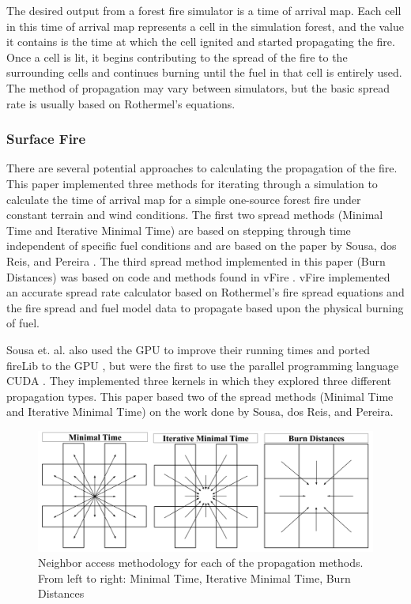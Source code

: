 The desired output from a forest fire simulator is a time of arrival map. Each cell in this time of arrival map represents a cell in the simulation forest, and the value it contains is the time at which the cell ignited and started propagating the fire. Once a cell is lit, it begins contributing to the spread of the fire to the surrounding cells and continues burning until the fuel in that cell is entirely used. The method of propagation may vary between simulators, but the basic spread rate is usually based on Rothermel's equations.


\subsubsection{Surface Fire}
There are several potential approaches to calculating the propagation of the fire. This paper implemented three methods for iterating through a simulation to calculate the time of arrival map for a simple one-source forest fire under constant terrain and wind conditions. The first two spread methods (Minimal Time and Iterative Minimal Time) are based on stepping through time independent of specific fuel conditions and are based on the paper by Sousa, dos Reis, and Pereira \cite{gpufire}. The third spread method implemented in this paper (Burn Distances) was based on code and methods found in vFire \cite{vFire}. vFire implemented an accurate spread rate calculator based on Rothermel's fire spread equations and the fire spread and fuel model data to propagate based upon the physical burning of fuel.

Sousa et. al. also used the GPU to improve their running times and ported fireLib to the GPU \cite{gpufire}, but were the first to use the parallel programming language CUDA \cite{cuda}. They implemented three kernels in which they explored three different propagation types. This paper based two of the spread methods (Minimal Time and Iterative Minimal Time) on the work done by Sousa, dos Reis, and Pereira. 

\begin{figure}%
\centering
\includegraphics[width=\linewidth]{figures/background/spread_methods.PNG}
\caption{Neighbor access methodology for each of the propagation methods. From left to right: Minimal Time, Iterative Minimal Time, Burn Distances}
\label{fig:spreadTypes}
\end{figure}

